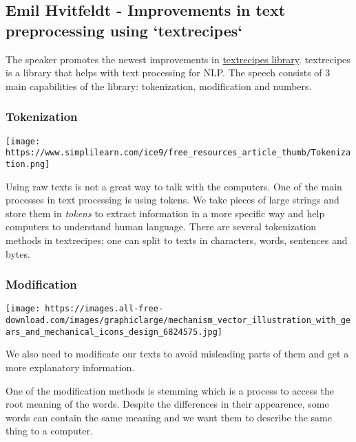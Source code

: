 \documentclass[
  letterpaper,
  DIV=11,
  numbers=noendperiod]{scrreprt}
\begin{document}
\hypertarget{emil-hvitfeldt---improvements-in-text-preprocessing-using-textrecipes}{%
\subsection{Emil Hvitfeldt - Improvements in text preprocessing using
`textrecipes`}\label{emil-hvitfeldt---improvements-in-text-preprocessing-using-textrecipes}}

The speaker promotes the newest improvements in
\href{https://cran.r-project.org/web/packages/textrecipes/index.html}{textrecipes
library}. textrecipes is a library that helps with text processing for
NLP. The speech consists of 3 main capabilities of the library:
tokenization, modification and numbers.

\hypertarget{tokenization}{%
\subsubsection{Tokenization}\label{tokenization}}

\texttt{[image: https://www.simplilearn.com/ice9/free\_resources\_article\_thumb/Tokenization.png]}

Using raw texts is not a great way to talk with the computers. One of
the main processes in text processing is using tokens. We take pieces of
large strings and store them in \emph{tokens} to extract information in
a more specific way and help computers to understand human language.
There are several tokenization methods in textrecipes; one can split to
texts in characters, words, sentences and bytes.

\hypertarget{modification}{%
\subsubsection{Modification}\label{modification}}

\texttt{[image: https://images.all-free-download.com/images/graphiclarge/mechanism\_vector\_illustration\_with\_gears\_and\_mechanical\_icons\_design\_6824575.jpg]}

We also need to modificate our texts to avoid misleading parts of them
and get a more explanatory information.

One of the modification methods is stemming which is a process to access
the root meaning of the words. Despite the differences in their
appearence, some words can contain the same meaning and we want them to
describe the same thing to a computer.
\end{document}
